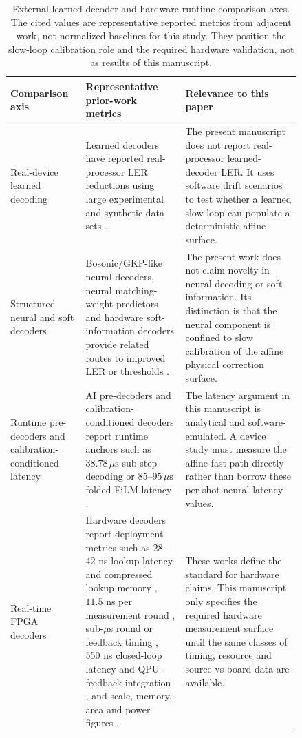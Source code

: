 \documentclass[11pt]{article}
\begin{document}
\begin{table}[htbp]
\centering
\small
\begin{tabular}{@{}>{\raggedright\arraybackslash}p{0.19\linewidth}>{\raggedright\arraybackslash}p{0.30\linewidth}>{\raggedright\arraybackslash}p{0.35\linewidth}@{}}
\toprule
Comparison axis & Representative prior-work metrics & Relevance to this paper \\
\midrule
Real-device learned decoding &
Learned decoders have reported real-processor LER reductions using large
experimental and synthetic data sets \cite{bausch2024,stein2026}. &
The present manuscript does not report real-processor learned-decoder LER.  It
uses software drift scenarios to test whether a learned slow loop can populate
a deterministic affine surface. \\
\addlinespace
Structured neural and soft decoders &
Bosonic/GKP-like neural decoders, neural matching-weight predictors and
hardware soft-information decoders provide related routes to improved LER or
thresholds \cite{wang2022,peled2026,hanisch2026}. &
The present work does not claim novelty in neural decoding or soft information.
Its distinction is that the neural component is confined to slow calibration
of the affine physical correction surface. \\
\addlinespace
Runtime pre-decoders and calibration-conditioned latency &
AI pre-decoders and calibration-conditioned decoders report runtime anchors
such as \(38.78\,\mu\mathrm{s}\) sub-step decoding or \(85\)--\(95\,\mu\mathrm{s}\)
folded FiLM latency \cite{chamberland2026,stein2026}. &
The latency argument in this manuscript is analytical and software-emulated.  A
device study must measure the affine fast path directly rather than borrow these
per-shot neural latency values. \\
\addlinespace
Real-time FPGA decoders &
Hardware decoders report deployment metrics such as \(28\)--\(42\) ns lookup
latency and compressed lookup memory \cite{lilliput2022}, \(11.5\) ns per
measurement round \cite{helios2023}, sub-\(\mu\)s round or feedback timing
\cite{caune2024,ziad2024,maurer2025}, 550 ns closed-loop latency and
QPU-feedback integration \cite{yang2026}, and scale, memory, area and power
figures \cite{collision2025}. &
These works define the standard for hardware claims.  This manuscript only
specifies the required hardware measurement surface until the same classes of
timing, resource and source-vs-board data are available. \\
\bottomrule
\end{tabular}
\caption{External learned-decoder and hardware-runtime comparison axes.  The
cited values are representative reported metrics from adjacent work, not
normalized baselines for this study.  They position the slow-loop calibration
role and the required hardware validation, not as results of this manuscript.}
\label{tab:external-runtime-comparison}
\end{table}
\end{document}
